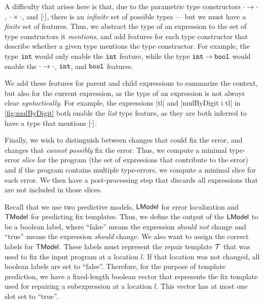 A difficulty that arises here is that, due to the parametric type constructors
$\cdot \to \cdot$, $\cdot \times \cdot$, and $[\cdot]$, there is an
\emph{infinite} set of possible types --- but we must have a \emph{finite} set
of features. Thus, we abstract the type of an expression to the set of type
constructors it \emph{mentions}, and add features for each type constructor that
describe whether a given type mentions the type constructor. For example, the
type $\mathtt{int}$ would only enable the $\mathtt{int}$ feature, while the type
$\mathtt{int} \to \mathtt{bool}$ would enable the $\cdot \to \cdot$, $\mathtt{int}$, and
$\mathtt{bool}$ features.

We add these features for parent and child expressions to summarize the context,
but also for the current expression, as the type of an expression is not always
clear \emph{syntactically}. For example, the expressions |tl| and
|mulByDigit i tl| in \autoref{fig:mulByDigit} both enable the \emph{list} type
feature, as they are both inferred to have a type that mentions $[\cdot]$.


Finally, we wish to distinguish between changes that could fix the error, and
changes that \emph{cannot possibly} fix the error. Thus, we compute a minimal
type-error \emph{slice} for the program (\ie the set of expressions that
contribute to the error) and if the program contains multiple type-errors, we
compute a minimal slice for each error. We then have a post-processing step that
discards all expressions that are not included in those slices.


Recall that we use two predictive models, $\mathsf{LModel}$ for error localization and
$\mathsf{TModel}$ for predicting fix templates. Thus, we define the output of the
$\mathsf{LModel}$ to be a boolean label, where ``false'' means the expression
\emph{should not} change and ``true'' means the expression \emph{should} change.
We also want to assign the correct labels for $\mathsf{TModel}$. These labels must
represent the repair template $\mathcal{T}$ that was used to fix the input program at a
location $l$. If that location was not changed, all boolean labels are set to
``false''. Therefore, for the purpose of template prediction, we have a
fixed-length boolean vector that represents the fix template used for repairing
a subexpression at a location $l$. This vector has at most one slot set to
``true''.

